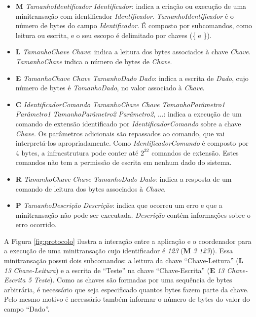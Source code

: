 \documentclass[11pt,twoside,a4paper]{book}
\begin{document}
\begin{itemize}
    \item \textbf{M} \textit{TamanhoIdentificador} \textit{Identificador}: indica a criação ou execução de uma minitransação com identificador \textit{Identificador}. \textit{TamanhoIdentificador} é o número de bytes do campo \textit{Identificador}. É composto por subcomandos, como leitura ou escrita, e o seu escopo é delimitado por chaves (\{ e \}).

    \item \textbf{L} \textit{TamanhoChave} \textit{Chave}: indica a leitura dos bytes associados à chave \textit{Chave}. \textit{TamanhoChave} indica o número de bytes de \textit{Chave}.

    \item \textbf{E} \textit{TamanhoChave} \textit{Chave} \textit{TamanhoDado} \textit{Dado}: indica a escrita de \textit{Dado}, cujo número de bytes é \textit{TamanhoDado}, no valor associado à \textit{Chave}.

    \item \textbf{C} \textit{IdentificadorComando} \textit{TamanhoChave} \textit{Chave} \textit{TamanhoParâmetro1} \textit{Parâmetro1} \textit{TamanhoParâmetro2} \textit{Parâmetro2}, ...: indica a execução de um comando de extensão identificado por \textit{IdentificadorComando} sobre a chave \textit{Chave}. Os parâmetros adicionais são repassados ao comando, que vai interpretá-los apropriadamente. Como \textit{IdentificadorComando} é composto por 4 bytes, a infraestrutura pode conter até $2^{32}$ comandos de extensão. Estes comandos não tem a permissão de escrita em nenhum dado do sistema.

    \item \textbf{R} \textit{TamanhoChave} \textit{Chave} \textit{TamanhoDado} \textit{Dado}: indica a resposta de um comando de leitura dos bytes associados à \textit{Chave}.

    \item \textbf{P} \textit{TamanhoDescrição} \textit{Descrição}: indica que ocorreu um erro e que a minitransação não pode ser executada. \textit{Descrição} contém informações sobre o erro ocorrido.
\end{itemize}

A Figura \ref{fig:protocolo} ilustra a interação entre a aplicação e o coordenador para a execução de uma minitransação cujo identificador é \textit{123} (\textbf{M} \textit{3 123})). Essa minitransação possui dois subcomandos: a leitura da chave ``Chave-Leitura'' (\textbf{L} \textit{13 Chave-Leitura}) e a escrita de ``Teste'' na chave ``Chave-Escrita'' (\textbf{E} \textit{13 Chave-Escrita 5 Teste}). Como as chaves são formadas por uma sequência de bytes arbitrária, é necessário que seja especificado quantos bytes fazem parte da chave. Pelo mesmo motivo é necessário também informar o número de bytes do valor do campo ``Dado''.
\end{document}
